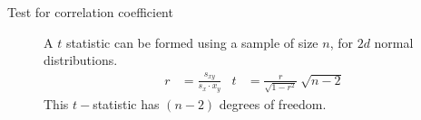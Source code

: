 \begin{description}
    \item[Test for correlation coefficient] A $ t $ statistic can be formed using a
          sample of size $ n $, for $ 2d $ normal distributions.
          \begin{align}
              r & = \frac{s_{xy}}{s_x \cdot x_y} & t & = \frac{r}{\sqrt{1 - r^2}}
              \ \sqrt{n-2}
          \end{align}
          This $ t- $statistic has $ (n-2) $ degrees of freedom.
\end{description}